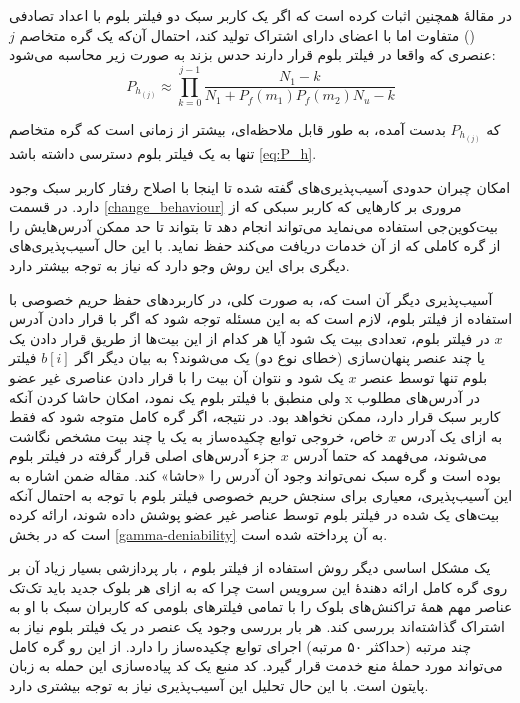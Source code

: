 	
در مقالهٔ \cite{Gervais2014} همچنین اثبات کرده است که اگر یک کاربر سبک دو فیلتر بلوم با اعداد تصادفی () متفاوت اما با اعضای دارای اشتراک تولید کند، احتمال آن‌که یک گره متخاصم $j$ عنصری که واقعا در فیلتر بلوم قرار دارند حدس بزند به صورت زیر محاسبه می‌شود:
\begin{equation}
\label{eq:P_h_multi_Bloom}
P_{h_{(j)}} \approx \prod_{k=0}^{j-1}\frac{N_1-k}{N_1+P_f(m_1)P_f(m_2)N_u-k}
\end{equation}

که
$P_{h_{(j)}}$
بدست آمده، به طور قابل ملاحظه‌ای، بیشتر از زمانی است که گره متخاصم تنها به یک فیلتر بلوم دسترسی داشته باشد \eqref{eq:P_h}. 

امکان چبران حدودی آسیب‌پذیری‌های گفته شده تا اینجا با اصلاح رفتار کاربر سبک وجود دارد. در قسمت \ref{change_behaviour} مروری بر کارهایی که کاربر سبکی که از بیت‌کوین‌جی استفاده می‌نماید می‌تواند انجام دهد تا بتواند تا حد ممکن آدرس‌هایش را از گره کاملی که از آن خدمات دریافت می‌کند حفظ نماید. با این حال آسیب‌پذیری‌های دیگری برای این روش وجو دارد که نیاز به توجه بیشتر دارد.

آسیب‌پذیری دیگر آن‌ است که، به صورت کلی، در کاربرد‌های حفظ حریم خصوصی با استفاده از فیلتر بلوم، لازم است که به این مسئله توجه شود که اگر با قرار دادن آدرس $x$ در فیلتر بلوم، تعدادی بیت یک شود آیا هر کدام از این بیت‌ها از طریق قرار دادن یک یا چند عنصر پنهان‌سازی (خطای نوع دو) یک می‌شوند؟ به بیان دیگر اگر $b[i]$ فیلتر بلوم تنها توسط عنصر $x$ یک شود و نتوان آن بیت‌ را با قرار دادن عناصری غیر عضو ولی منطبق با فیلتر بلوم یک نمود، امکان حاشا کردن آنکه x در آدرس‌های مطلوب کاربر سبک قرار دارد، ممکن نخواهد بود. در نتیجه، اگر گره کامل متوجه شود که فقط به ازای یک آدرس $x$ خاص، خروجی توابع چکیده‌ساز به یک یا چند بیت مشخص نگاشت می‌شوند، می‌فهمد که حتما آدرس  $x$ جزء آدرس‌های اصلی قرار گرفته در فیلتر بلوم بوده است و گره سبک نمی‌تواند وجود آن آدرس را «حاشا» کند. مقاله \cite{Bianchi2012} ضمن اشاره به این آسیب‌پذیری، معیاری برای سنجش حریم خصوصی فیلتر بلوم با توجه به احتمال آنکه بیت‌های یک شده در فیلتر بلوم توسط عناصر غیر عضو پوشش داده شوند، ارائه کرده است که در بخش \ref{gamma-deniability} به آن پرداخته شده است.

یک مشکل اساسی دیگر روش استفاده از فیلتر بلوم \cite{Hearn2013}، بار پردازشی بسیار زیاد آن بر روی گره کامل ارائه دهندهٔ این سرویس است چرا که به ازای هر بلوک جدید باید تک‌تک عناصر مهم همهٔ تراکنش‌های بلوک را با تمامی فیلتر‌های بلومی که کاربران سبک با او به اشتراک گذاشته‌اند بررسی کند. هر بار بررسی وجود یک عنصر در یک فیلتر بلوم نیاز به چند مرتبه (حداکثر ۵۰ مرتبه) اجرای توابع چکیده‌ساز را دارد. از این رو گره کامل می‌تواند مورد 
حملهٔ منع خدمت 
قرار گیرد. کد منبع \cite{PeterTodd} یک کد پیاده‌سازی این حمله به زبان پایتون است. با این حال تحلیل این آسیب‌پذیری نیاز به توجه بیشتری دارد.

